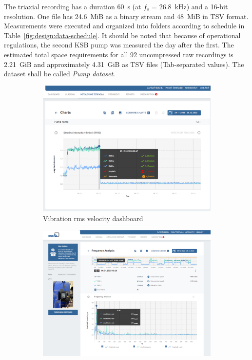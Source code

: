 The triaxial recording has a duration 60~s (at $f_s$ = 26.8~kHz) and a 16-bit resolution. One file has 24.6~MiB as a binary stream and 48~MiB in TSV format. 
Measurements were executed and organized into folders according to schedule in Table~\ref{fig:design:data-schedule}. It should be noted that because of operational regulations, the second KSB pump was measured the day after the first. The estimated total space requirements for all 92 uncompressed raw recordings is 2.21~GiB and approximately 4.31~GiB as TSV files (Tab-separated values). The dataset shall be called \emph{Pump dataset}.

\begin{figure}[h]
    \centering
    \begin{subfigure}[b]{0.49\textwidth}
    		\centering
        \includegraphics[width=\textwidth]{assets/design/ksb-guard-rms.png}
        \caption{Vibration rms velocity dashboard}
    \end{subfigure}
    \hfill
    \begin{subfigure}[b]{0.49\textwidth}
    		\centering
        \includegraphics[width=\textwidth]{assets/design/ksb-guard-spectrum.png}

\end{subfigure}
\end{figure}
